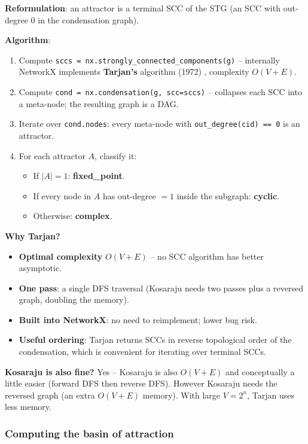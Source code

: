 \documentclass[oneside,final]{hcmut-report}
\begin{document}
\textbf{Reformulation}: an attractor is a terminal SCC of the STG (an SCC with out-degree 0 in the condensation graph).

\textbf{Algorithm}:
\begin{enumerate}[leftmargin=*]
    \item Compute \texttt{sccs = nx.strongly\_connected\_components(g)} -- internally NetworkX implements \textbf{Tarjan's} algorithm (1972) \cite{tarjan1972scc}, complexity $O(V + E)$.
    \item Compute \texttt{cond = nx.condensation(g, scc=sccs)} -- collapses each SCC into a meta-node; the resulting graph is a DAG.
    \item Iterate over \texttt{cond.nodes}: every meta-node with \texttt{out\_degree(cid) == 0} is an attractor.
    \item For each attractor $A$, classify it:
    \begin{itemize}
        \item If $|A| = 1$: \textbf{fixed\_point}.
        \item If every node in $A$ has out-degree $= 1$ inside the subgraph: \textbf{cyclic}.
        \item Otherwise: \textbf{complex}.
    \end{itemize}
\end{enumerate}

\textbf{Why Tarjan?}

\begin{itemize}[leftmargin=*]
    \item \textbf{Optimal complexity} $O(V + E)$ -- no SCC algorithm has better asymptotic.
    \item \textbf{One pass}: a single DFS traversal (Kosaraju needs two passes plus a reversed graph, doubling the memory).
    \item \textbf{Built into NetworkX}: no need to reimplement; lower bug risk.
    \item \textbf{Useful ordering}: Tarjan returns SCCs in reverse topological order of the condensation, which is convenient for iterating over terminal SCCs.
\end{itemize}

\textbf{Kosaraju is also fine?} Yes -- Kosaraju is also $O(V + E)$ and conceptually a little easier (forward DFS then reverse DFS). However Kosaraju needs the reversed graph (an extra $O(V+E)$ memory). With large $V = 2^n$, Tarjan uses less memory.

\subsubsection{Computing the basin of attraction}
\end{document}
